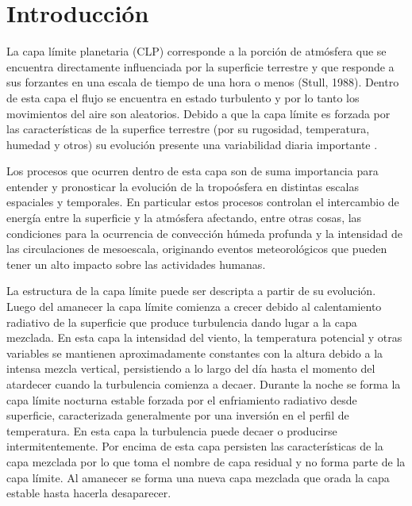 \documentclass[12pt,spanish,oneside, a4paper]{book}
\begin{document}
\setcounter{tocdepth}{4} \tableofcontents

\listoffigures
\newpage

\listoftables
\newpage

\chapter{Introducción}\label{introduccion}

La capa límite planetaria (CLP) corresponde a la porción de atmósfera
que se encuentra directamente influenciada por la superficie terrestre y
que responde a sus forzantes en una escala de tiempo de una hora o menos
(Stull, 1988). Dentro de esta capa el flujo se encuentra en estado
turbulento y por lo tanto los movimientos del aire son aleatorios.
Debido a que la capa límite es forzada por las características de la
superfice terrestre (por su rugosidad, temperatura, humedad y otros) su
evolución presente una variabilidad diaria importante .

Los procesos que ocurren dentro de esta capa son de suma importancia
para entender y pronosticar la evolución de la tropoósfera en distintas
escalas espaciales y temporales. En particular estos procesos controlan
el intercambio de energía entre la superficie y la atmósfera afectando,
entre otras cosas, las condiciones para la ocurrencia de convección
húmeda profunda y la intensidad de las circulaciones de mesoescala,
originando eventos meteorológicos que pueden tener un alto impacto sobre
las actividades humanas.

La estructura de la capa límite puede ser descripta a partir de su
evolución. Luego del amanecer la capa límite comienza a crecer debido al
calentamiento radiativo de la superficie que produce turbulencia dando
lugar a la capa mezclada. En esta capa la intensidad del viento, la
temperatura potencial y otras variables se mantienen aproximadamente
constantes con la altura debido a la intensa mezcla vertical,
persistiendo a lo largo del día hasta el momento del atardecer cuando la
turbulencia comienza a decaer. Durante la noche se forma la capa límite
nocturna estable forzada por el enfriamiento radiativo desde superficie,
caracterizada generalmente por una inversión en el perfil de
temperatura. En esta capa la turbulencia puede decaer o producirse
intermitentemente. Por encima de esta capa persisten las características
de la capa mezclada por lo que toma el nombre de capa residual y no
forma parte de la capa límite. Al amanecer se forma una nueva capa
mezclada que orada la capa estable hasta hacerla desaparecer.
\end{document}
